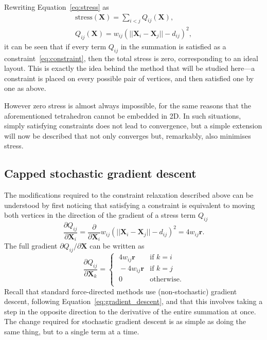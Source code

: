 Rewriting Equation~\eqref{eq:stress} as
\begin{gather}
\label{stress-terms}
\mathrm{stress}(\mathbf{X}) = \sum_{i<j} Q_{ij}(\mathbf{X}),\\
\label{qij}
Q_{ij}(\mathbf{X}) = w_{ij}(||\mathbf{X}_i - \mathbf{X}_j|| - d_{ij})^2,
\end{gather}
it can be seen that if every term $Q_{ij}$ in the summation is satisfied as a constraint~\eqref{eq:constraint}, then the total stress is zero, corresponding to an ideal layout. 
This is exactly the idea behind the method that will be studied here---a constraint is placed on every possible pair of vertices, and then satisfied one by one as above.

However zero stress is almost always impossible, for the same reasons that the aforementioned tetrahedron cannot be embedded in 2D. In such situations, simply satisfying constraints does not lead to convergence, but a simple extension will now be described that not only converges but, remarkably, also minimises stress.

\subsection{Capped stochastic gradient descent}
\label{sec:sgd_description}
The modifications required to the constraint relaxation described above can be understood by first noticing that satisfying a constraint is equivalent to moving both vertices in the direction of the gradient of a stress term $Q_{ij}$
\begin{equation}
  \label{gradient}
  \frac{\partial Q_{ij}}{\partial\mathbf{X}_i}=\frac{\partial}{\partial\mathbf{X}_i}w_{ij}(||\mathbf{X}_i - \mathbf{X}_j|| - d_{ij})^2 = 4w_{ij}\mathbf{r}.
\end{equation}
The full gradient $\partial Q_{ij}/\partial\mathbf{X}$ can be written as
\begin{equation}
  \frac{\partial Q_{ij}}{\partial\mathbf{X}_k}=
  \begin{cases}
    \;4w_{ij}\mathbf{r} & \mbox{if $k=i$} \\
    \;-4w_{ij}\mathbf{r} & \mbox{if $k=j$} \\
    \;0 & \mbox{otherwise.} \\
  \end{cases}
\end{equation}
Recall that standard force-directed methods use (non-stochastic) gradient descent, following Equation~\eqref{eq:gradient_descent}, and that this involves taking a step in the opposite direction to the derivative of the entire summation at once.
The change required for stochastic gradient descent is as simple as doing the same thing, but to a single term at a time.


